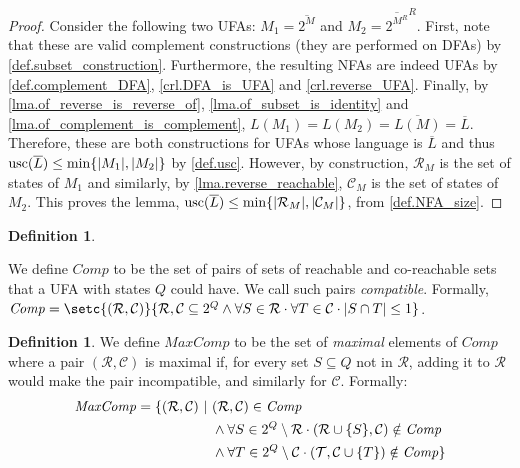 \documentclass{report}
\DeclarePairedDelimiter{\set}{\{}{\}}
\DeclarePairedDelimiter{\abs}{\lvert}{\rvert}
\theoremstyle{definition}
\newtheorem{definition}[theorem]{Definition}
\begin{document}
\begin{proof}
Consider the following two UFAs:
$M_1 = \overline{2^M}$ and $M_2 = \overline{2^{M^R}}^R$.
First, note that these are valid complement constructions (they are performed on
DFAs) by \cref{def.subset_construction}. Furthermore, the resulting NFAs
are indeed UFAs by \cref{def.complement_DFA}, \cref{crl.DFA_is_UFA} and
\cref{crl.reverse_UFA}. Finally, by \cref{lma.of_reverse_is_reverse_of},
\cref{lma.of_subset_is_identity} and \cref{lma.of_complement_is_complement},
$L(M_1) = L(M_2) = \overline{L(M)} = \overline{L}$.
Therefore, these are both constructions for UFAs whose language is $\overline{L}$
and thus $\mathrm{usc}(\overline{L}) \leq \min\set{\abs{M_1}, \abs{M_2}}$ by
\cref{def.usc}. However, by construction, $\mathcal{R}_M$ is the set of states of
$M_1$ and similarly, by \cref{lma.reverse_reachable}, $\mathcal{C}_M$ is the set
of states of $M_2$. This proves the lemma, $\mathrm{usc}(\overline{L}) \leq
\min\set{\abs{\mathcal{R}_M}, \abs{\mathcal{C}_M}}$, from \cref{def.NFA_size}.
\end{proof}

\begin{definition} \label{def.comp}
\begin{sloppypar}
We define $\mathit{Comp}$ to be the set of pairs of sets of reachable and
co-reachable sets that a UFA with states $Q$ could have.
We call such pairs \emph{compatible}. Formally,
${\mathit{Comp} = \setc{(\mathcal{R}, \mathcal{C})}{\mathcal{R}, \mathcal{C} \subseteq 2^Q
\wedge \forall S \in \mathcal{R} \cdot \forall T \in \mathcal{C} \cdot
\abs{S \cap T} \leq 1}}$.
\end{sloppypar}
\end{definition}

\begin{definition} \label{def.max_comp}
We define $\mathit{MaxComp}$ to be the set of \emph{maximal} elements of $\mathit{Comp}$ where a
pair $(\mathcal{R}, \mathcal{C})$ is maximal if, for every set $S \subseteq Q$
not in $\mathcal{R}$, adding it to $\mathcal{R}$ would make the pair
incompatible, and similarly for $\mathcal{C}$. Formally:
\begin{align*}
\mathit{MaxComp} = \{ (\mathcal{R}, \mathcal{C}) \ \vert \
& (\mathcal{R}, \mathcal{C}) \in \mathit{Comp} \\
& \wedge \forall S \in 2^Q \setminus \mathcal{R} \cdot
(\mathcal{R} \cup \set{S}, \mathcal{C}) \notin \mathit{Comp} \\
& \wedge \forall T \in 2^Q \setminus \mathcal{C} \cdot
(\mathcal{T}, \mathcal{C} \cup \set{T}) \notin \mathit{Comp} \}
\end{align*}
\end{definition}
\end{document}

